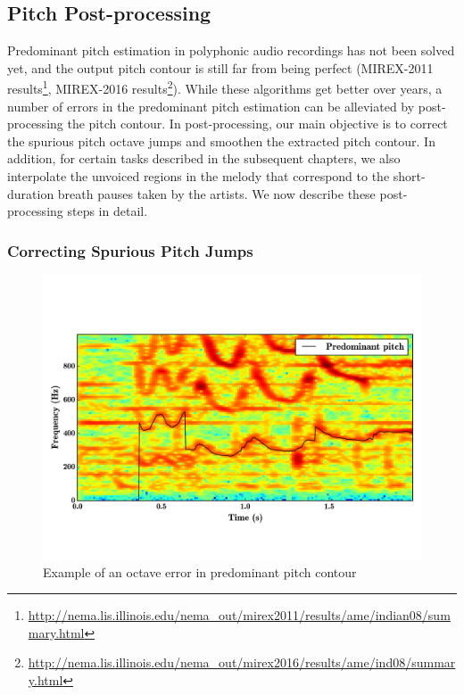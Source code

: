 {\subsection{Pitch Post-processing}
\label{sec:data_preprocessing_pitch_postprocessing}

Predominant pitch estimation in polyphonic audio recordings has not been solved yet, and the output pitch contour is still far from being perfect (MIREX-2011 results\footnote{\url{http://nema.lis.illinois.edu/nema_out/mirex2011/results/ame/indian08/summary.html}}, MIREX-2016 results\footnote{\url{http://nema.lis.illinois.edu/nema_out/mirex2016/results/ame/ind08/summary.html}}). While these algorithms get better over years, a number of errors in the predominant pitch estimation can be alleviated by post-processing the pitch contour. In post-processing, our main objective is to correct the spurious pitch octave jumps and smoothen the extracted pitch contour. In addition, for certain tasks described in the subsequent chapters, we also interpolate the unvoiced regions in the melody that correspond to the short-duration breath pauses taken by the artists. We now describe these post-processing steps in detail.

\subsubsection{Correcting Spurious Pitch Jumps}
\label{sec:data_processing_correcting_pitch_jumps}

\begin{figure}
	\begin{center}
		\includegraphics[width=\figSizeHundred]{ch05_preprocessing/figures/octaveErrorIllustration.png}
	\end{center}
	\caption{Example of an octave error in predominant pitch contour}
	\label{fig:octave_error_pitch}
\end{figure}

}
